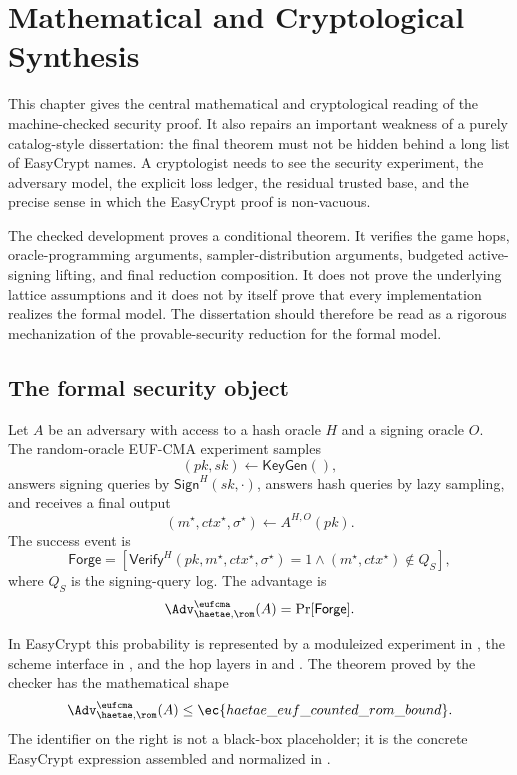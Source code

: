 \chapter{Mathematical and Cryptological Synthesis}
\label{ch:mathematical-cryptological-synthesis}

This chapter gives the central mathematical and cryptological reading of the
machine-checked \haetae{} security proof.  It also repairs an important weakness
of a purely catalog-style dissertation: the final theorem must not be hidden
behind a long list of EasyCrypt names.  A cryptologist needs to see the security
experiment, the adversary model, the explicit loss ledger, the residual trusted
base, and the precise sense in which the EasyCrypt proof is non-vacuous.

The checked development proves a conditional theorem.  It verifies the game
hops, oracle-programming arguments, sampler-distribution arguments, budgeted
active-signing lifting, and final reduction composition.  It does not prove the
underlying lattice assumptions and it does not by itself prove that every
implementation realizes the formal model.  The dissertation should therefore be
read as a rigorous mechanization of the provable-security reduction for the
formal \haetae{} model.

\section{The formal security object}
\label{sec:synthesis-formal-object-rewritten}

Let \(A\) be an adversary with access to a hash oracle \(H\) and a signing
oracle \(O\).  The random-oracle EUF-CMA experiment samples
\[
  (pk,sk) \leftarrow \mathsf{KeyGen}(),
\]
answers signing queries by \(\mathsf{Sign}^{H}(sk,\cdot)\), answers hash queries
by lazy sampling, and receives a final output
\[
  (m^\star,ctx^\star,\sigma^\star)\leftarrow A^{H,O}(pk).
\]
The success event is
\[
  \mathsf{Forge}
  =
  \left[
    \mathsf{Verify}^{H}(pk,m^\star,ctx^\star,\sigma^\star)=1
    \wedge
    (m^\star,ctx^\star)\notin Q_S
  \right],
\]
where \(Q_S\) is the signing-query log.  The advantage is
\[
  \Adv_{\haetae,\rom}^{\eufcma}(A)=\Pr[\mathsf{Forge}].
\]

In EasyCrypt this probability is represented by a moduleized experiment in
, the scheme interface in , and the hop
layers in  and .  The theorem
proved by the checker has the mathematical shape
\[
  \Adv_{\haetae,\rom}^{\eufcma}(A)
  \le
  \ec{haetae\_euf\_counted\_rom\_bound}.
\]
The identifier on the right is not a black-box placeholder; it is the concrete
EasyCrypt expression assembled and normalized in .

